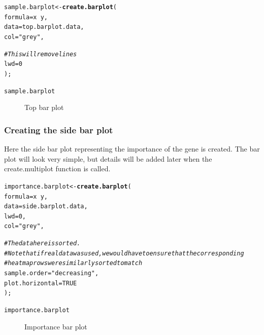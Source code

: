 \documentclass[letterpaper]{article}\usepackage[]{graphicx}\usepackage[]{color}
\makeatletter
\newcommand{\hlnum}[1]{\textcolor[rgb]{0.686,0.059,0.569}{#1}}%
\newcommand{\hlstr}[1]{\textcolor[rgb]{0.192,0.494,0.8}{#1}}%
\newcommand{\hlcom}[1]{\textcolor[rgb]{0.678,0.584,0.686}{\textit{#1}}}%
\newcommand{\hlopt}[1]{\textcolor[rgb]{0,0,0}{#1}}%
\newcommand{\hlstd}[1]{\textcolor[rgb]{0.345,0.345,0.345}{#1}}%
\newcommand{\hlkwb}[1]{\textcolor[rgb]{0.69,0.353,0.396}{#1}}%
\newcommand{\hlkwc}[1]{\textcolor[rgb]{0.333,0.667,0.333}{#1}}%
\newcommand{\hlkwd}[1]{\textcolor[rgb]{0.737,0.353,0.396}{\textbf{#1}}}%
\newenvironment{kframe}{%
 \def\at@end@of@kframe{}%
 \ifinner\ifhmode%
  \def\at@end@of@kframe{\end{minipage}}%
  \begin{minipage}{\columnwidth}%
 \fi\fi%
 \def\FrameCommand##1{\hskip\@totalleftmargin \hskip-\fboxsep
 \colorbox{shadecolor}{##1}\hskip-\fboxsep
     \hskip-\linewidth \hskip-\@totalleftmargin \hskip\columnwidth}%
 \MakeFramed {\advance\hsize-\width
   \@totalleftmargin\z@ \linewidth\hsize
   \@setminipage}}%
 {\par\unskip\endMakeFramed%
 \at@end@of@kframe}
\newenvironment{knitrout}{}{} %
\makeatother
\begin{document}
\begin{knitrout}
\color{fgcolor}\begin{kframe}
\begin{alltt}
\hlstd{sample.barplot} \hlkwb{<-} \hlkwd{create.barplot}\hlstd{(}
     \hlkwc{formula} \hlstd{= x}\hlopt{~}\hlstd{y,}
     \hlkwc{data} \hlstd{= top.barplot.data,}
     \hlkwc{col} \hlstd{=} \hlstr{"grey"}\hlstd{,}

     \hlcom{# This will remove lines}
     \hlkwc{lwd} \hlstd{=} \hlnum{0}
     \hlstd{);}

\hlstd{sample.barplot}
\end{alltt}
\end{kframe}\begin{figure}[]


{\centering {} 

}

\caption[Top bar plot]{Top bar plot\label{fig:multiplotex2_topbarplot}}
\end{figure}


\end{knitrout}

\subsubsection{Creating the side bar plot}

Here the side bar plot representing the importance of the gene is created. The bar plot will look very simple, but details will be added later when the create.multiplot function is called.

\begin{knitrout}
\color{fgcolor}\begin{kframe}
\begin{alltt}
\hlstd{importance.barplot} \hlkwb{<-} \hlkwd{create.barplot}\hlstd{(}
     \hlkwc{formula} \hlstd{= x}\hlopt{~}\hlstd{y,}
     \hlkwc{data} \hlstd{= side.barplot.data,}
     \hlkwc{lwd} \hlstd{=} \hlnum{0}\hlstd{,}
     \hlkwc{col} \hlstd{=} \hlstr{"grey"}\hlstd{,}

     \hlcom{# The data here is sorted. }
     \hlcom{# Note that if real data was used, we would have to ensure that the corresponding }
     \hlcom{# heatmap rows were similarly sorted to match}
     \hlkwc{sample.order} \hlstd{=} \hlstr{"decreasing"}\hlstd{,}
     \hlkwc{plot.horizontal} \hlstd{=} \hlnum{TRUE}
     \hlstd{);}

\hlstd{importance.barplot}
\end{alltt}
\end{kframe}\begin{figure}[]


{\centering {} 

}

\caption[Importance bar plot]{Importance bar plot\label{fig:multiplotex2_sidebarplot}}
\end{figure}


\end{knitrout}
\end{document}

